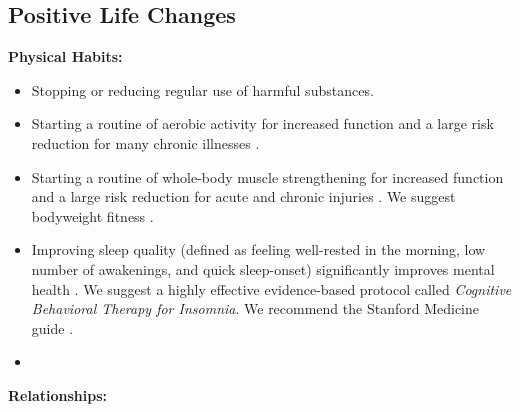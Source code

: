 \documentclass[12pt,letterpaper]{article}
\begin{document}
\subsection{Positive Life Changes}
\label{sec:lifechanges}
\noindent \textbf{Physical Habits:}
\begin{itemize}
    \item Stopping or reducing regular use of harmful substances.
    \item Starting a routine of aerobic activity for increased function and a large risk reduction for many chronic illnesses \cite{liebermanExercised}. 
    \item Starting a routine of whole-body muscle strengthening for increased function and a large risk reduction for acute and chronic injuries \cite{lauersenStrength}. We suggest bodyweight fitness \cite{lowBodyweight}.  
    \item Improving sleep quality (defined as feeling well-rested in the morning, low number of awakenings, and quick sleep-onset) significantly improves mental health \cite{scottSleep}. We suggest a highly effective evidence-based protocol called \textit{Cognitive Behavioral Therapy for Insomnia}. We recommend the Stanford Medicine guide \cite{stanfordSleep}.
    \item {}
\end{itemize}
\noindent \textbf{Relationships:}
\end{document}
